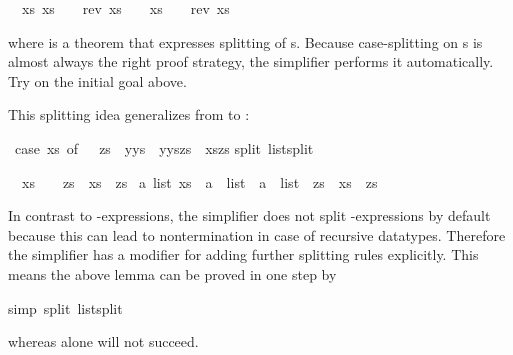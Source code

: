 \begin{isabellebody}
\begin{isamarkuptxt}
\noindent
\begin{isabelle}%
\ {}{\isachardot}\ {\isasymforall}xs{\isachardot}\ {\isacharparenleft}xs\ {\isacharequal}\ {\isacharbrackleft}{\isacharbrackright}\ {\isasymlongrightarrow}\ rev\ xs\ {\isacharequal}\ {\isacharbrackleft}{\isacharbrackright}{\isacharparenright}\ {\isasymand}\ {\isacharparenleft}xs\ {\isasymnoteq}\ {\isacharbrackleft}{\isacharbrackright}\ {\isasymlongrightarrow}\ rev\ xs\ {\isasymnoteq}\ {\isacharbrackleft}{\isacharbrackright}{\isacharparenright}%
\end{isabelle}
where  is a theorem that expresses splitting of
s. Because
case-splitting on s is almost always the right proof strategy, the
simplifier performs it automatically. Try 
on the initial goal above.

This splitting idea generalizes from  to :%
\end{isamarkuptxt}%
\ {\isachardoublequote}{\isacharparenleft}case\ xs\ of\ {\isacharbrackleft}{\isacharbrackright}\ {\isasymRightarrow}\ zs\ {\isacharbar}\ y{\isacharhash}ys\ {\isasymRightarrow}\ y{\isacharhash}{\isacharparenleft}ys{\isacharat}zs{\isacharparenright}{\isacharparenright}\ {\isacharequal}\ xs{\isacharat}zs{\isachardoublequote}\isanewline
{}split\ list{\isachardot}split{\isacharparenright}%
\begin{isamarkuptxt}%
\begin{isabelle}%
\ {}{\isachardot}\ {\isacharparenleft}xs\ {\isacharequal}\ {\isacharbrackleft}{\isacharbrackright}\ {\isasymlongrightarrow}\ zs\ {\isacharequal}\ xs\ {\isacharat}\ zs{\isacharparenright}\ {\isasymand}\isanewline
{}a\ list{\isachardot}\ xs\ {\isacharequal}\ a\ {\isacharhash}\ list\ {\isasymlongrightarrow}\ a\ {\isacharhash}\ list\ {\isacharat}\ zs\ {\isacharequal}\ xs\ {\isacharat}\ zs{\isacharparenright}%
\end{isabelle}
In contrast to -expressions, the simplifier does not split
-expressions by default because this can lead to nontermination
in case of recursive datatypes. Therefore the simplifier has a modifier
 for adding further splitting rules explicitly. This means the
above lemma can be proved in one step by%
\end{isamarkuptxt}%
simp\ split{\isacharcolon}\ list{\isachardot}split{\isacharparenright}%
\begin{isamarkuptext}%
\noindent
whereas  alone will not succeed.


\end{isamarkuptext}
\end{isabellebody}
